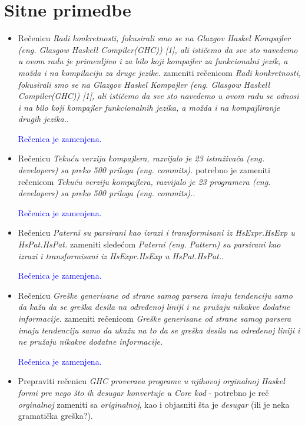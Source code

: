 \documentclass[a4paper]{report}
\newcommand{\odgovor}[1]{\textcolor{blue}{#1}}
\begin{document}
	\section{Sitne primedbe}
	\begin{itemize}
		\item Rečenicu \textit{Radi konkretnosti, fokusirali smo se na Glazgov Haskel Kompajler (eng. Glasgow Haskell Compiler(GHC)) [1], ali ističemo da sve sto navedemo u ovom radu je primenljivo i za bilo koji kompajler za funkcionalni jezik, a možda i na kompilaciju za druge jezike.} zameniti rečenicom \textit{Radi konkretnosti, fokusirali smo se na Glazgov Haskel Kompajler (eng. Glasgow Haskell Compiler(GHC)) [1], ali ističemo da sve sto navedemo u ovom radu se odnosi i na bilo koji kompajler funkcionalnih jezika, a možda i na kompajliranje drugih jezika.}. 
		
		\odgovor{Rečenica je zamenjena.}
		
		\item Rečenicu \textit{Tekuću verziju kompajlera, razvijalo je 23 istraživača (eng. developers) sa preko 500 priloga (eng. commits).}  potrebno je zameniti rečenicom \textit{Tekuću verziju kompajlera, razvijalo je 23 programera (eng. developers) sa preko 500 priloga (eng. commits).}.
		
		\odgovor{Rečenica je zamenjena.}
		
		\item Rečenicu \textit{Paterni su parsirani kao izrazi i transformisani iz HsExpr.HsExp u HsPat.HsPat.} zameniti sledećom \textit{Paterni (eng. Pattern) su parsirani kao izrazi i transformisani iz HsExpr.HsExp u HsPat.HsPat.}.
		
		\odgovor{Rečenica je zamenjena.}
		
		\item Rečenicu \textit{Greške generisane od strane samog parsera imaju tendenciju samo da kažu da se greška desila na određenoj liniji i ne pružaju nikakve dodatne informacije.} zameniti rečenicom \textit{Greške generisane od strane samog parsera imaju tendenciju samo da ukažu na to da se greška desila na određenoj liniji i ne pružaju nikakve dodatne informacije.}
		
		\odgovor{Rečenica je zamenjena.}
		
		\item Prepraviti rečenicu \textit{GHC proverava programe u njihovoj orginalnoj Haskel formi pre nego što ih desugar konvertuje u Core kod} - potrebno je reč \textit{orginalnoj} zameniti sa \textit{originalnoj}, kao i objasniti šta je \textit{desugar} (ili je neka gramatička greška?).
		

\end{itemize}
\end{document}
